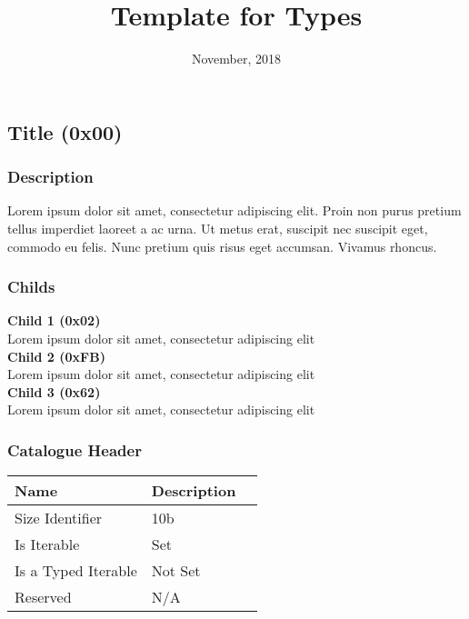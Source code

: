 \documentclass[11pt]{article}
\title{Template for Types}
\date{November, 2018}
\begin{document}
\maketitle

\subsection{Title (0x00)}
\subsubsection{Description}
Lorem ipsum dolor sit amet, consectetur adipiscing elit. Proin non purus pretium tellus imperdiet laoreet a ac urna. Ut metus erat, suscipit nec suscipit eget, commodo eu felis. Nunc pretium quis risus eget accumsan. Vivamus rhoncus.

\subsubsection{Childs}
\textbf{Child 1 (0x02)} \\
Lorem ipsum dolor sit amet, consectetur adipiscing elit \\
\textbf{Child 2 (0xFB)} \\
Lorem ipsum dolor sit amet, consectetur adipiscing elit \\
\textbf{Child 3 (0x62)} \\
Lorem ipsum dolor sit amet, consectetur adipiscing elit \\

\subsubsection{Catalogue Header}

\begin{center}
\begin{tabular}{ |l|l|l| } 
\hline
\textbf{Name} & \textbf{Description}\\
\hline
Size Identifier & 10b \\
Is Iterable & Set \\
Is a Typed Iterable & Not Set \\   
Reserved & N/A \\ 
\hline
\end{tabular}
\end{center}
\end{document}
